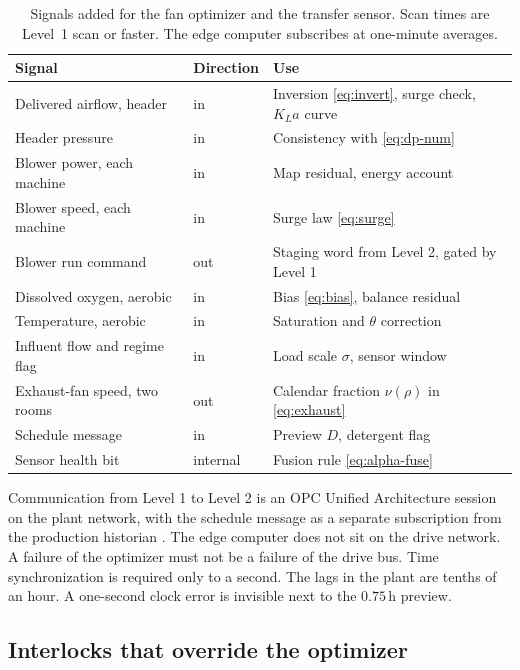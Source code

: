 \begin{table}[ht]
\centering
\caption{Signals added for the fan optimizer and the transfer sensor. Scan times are Level~1 scan or faster. The edge computer subscribes at one-minute averages.}
\label{tab:io}
\begin{tabular}{@{}p{4.6cm}p{2.4cm}p{6.0cm}@{}}
\toprule
Signal & Direction & Use \\
\midrule
Delivered airflow, header & in & Inversion \eqref{eq:invert}, surge check, $K_La$ curve \\
Header pressure & in & Consistency with \eqref{eq:dp-num} \\
Blower power, each machine & in & Map residual, energy account \\
Blower speed, each machine & in & Surge law \eqref{eq:surge} \\
Blower run command & out & Staging word from Level 2, gated by Level 1 \\
Dissolved oxygen, aerobic & in & Bias \eqref{eq:bias}, balance residual \\
Temperature, aerobic & in & Saturation and $\theta$ correction \\
Influent flow and regime flag & in & Load scale $\sigma$, sensor window \\
Exhaust-fan speed, two rooms & out & Calendar fraction $\nu(\rho)$ in \eqref{eq:exhaust} \\
Schedule message & in & Preview $D$, detergent flag \\
Sensor health bit & internal & Fusion rule \eqref{eq:alpha-fuse} \\
\bottomrule
\end{tabular}
\end{table}

Communication from Level 1 to Level 2 is an OPC Unified Architecture session on the plant network, with the schedule message as a separate subscription from the production historian \cite{mahnke2009opc,isa95}. The edge computer does not sit on the drive network. A failure of the optimizer must not be a failure of the drive bus. Time synchronization is required only to a second. The lags in the plant are tenths of an hour. A one-second clock error is invisible next to the $0.75\,\mathrm{h}$ preview.

\subsection{Interlocks that override the optimizer}

